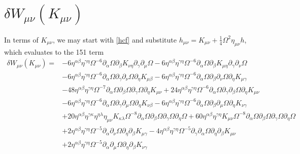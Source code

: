 \documentclass[10pt,letterpaper]{article}
\begin{document}
\section{$\delta W_{\mu\nu}(K_{\mu\nu})$}
In terms of $K_{\mu\nu}$, we may start with \eqref{hcf} and substitute $h_{\mu\nu} = K_{\mu\nu} + \frac14 \Omega^2 \eta_{\mu\nu} h$, which evaluates to the 151 term 
\begin{align}
\delta W_{\mu\nu}(K_{\mu\nu})={}&-6 \eta^{\alpha \beta} \eta^{\gamma \eta} \Omega^{-6} \partial_{\alpha}\Omega \partial_{\beta}K_{\nu \eta} \partial_{\gamma}\partial_{\mu}\Omega
 - 6 \eta^{\alpha \beta} \eta^{\gamma \eta} \Omega^{-6} \partial_{\alpha}\Omega \partial_{\beta}K_{\mu \eta} \partial_{\gamma}\partial_{\nu}\Omega\nonumber\\
& - 6 \eta^{\alpha \beta} \eta^{\gamma \eta} \Omega^{-6} \partial_{\alpha}\Omega \partial_{\gamma}\partial_{\nu}\Omega \partial_{\eta}K_{\mu \beta}
 - 6 \eta^{\alpha \beta} \eta^{\gamma \eta} \Omega^{-6} \partial_{\alpha}\Omega \partial_{\beta}\partial_{\nu}\Omega \partial_{\eta}K_{\mu \gamma}\nonumber\\
& - 48 \eta^{\alpha \beta} \eta^{\gamma \eta} \Omega^{-7} \partial_{\alpha}\Omega \partial_{\beta}\Omega \partial_{\gamma}\Omega \partial_{\eta}K_{\mu \nu}
 + 24 \eta^{\alpha \beta} \eta^{\gamma \eta} \Omega^{-6} \partial_{\alpha}\Omega \partial_{\gamma}\partial_{\beta}\Omega \partial_{\eta}K_{\mu \nu}\nonumber\\
& - 6 \eta^{\alpha \beta} \eta^{\gamma \eta} \Omega^{-6} \partial_{\alpha}\Omega \partial_{\gamma}\partial_{\mu}\Omega \partial_{\eta}K_{\nu \beta}
 - 6 \eta^{\alpha \beta} \eta^{\gamma \eta} \Omega^{-6} \partial_{\alpha}\Omega \partial_{\beta}\partial_{\mu}\Omega \partial_{\eta}K_{\nu \gamma}\nonumber\\
& + 20 \eta^{\alpha \beta} \eta^{\gamma \kappa} \eta^{\eta \lambda} \eta_{\mu \nu} K_{\kappa \lambda} \Omega^{-8} \partial_{\alpha}\Omega \partial_{\beta}\Omega \partial_{\gamma}\Omega \partial_{\eta}\Omega
 + 60 \eta^{\alpha \beta} \eta^{\gamma \eta} K_{\mu \nu} \Omega^{-8} \partial_{\alpha}\Omega \partial_{\beta}\Omega \partial_{\gamma}\Omega \partial_{\eta}\Omega\nonumber\\
& + 2 \eta^{\alpha \beta} \eta^{\gamma \eta} \Omega^{-5} \partial_{\alpha}\partial_{\nu}\Omega \partial_{\eta}\partial_{\beta}K_{\mu \gamma}
 - 4 \eta^{\alpha \beta} \eta^{\gamma \eta} \Omega^{-5} \partial_{\gamma}\partial_{\alpha}\Omega \partial_{\eta}\partial_{\beta}K_{\mu \nu}\nonumber\\
& + 2 \eta^{\alpha \beta} \eta^{\gamma \eta} \Omega^{-5} \partial_{\alpha}\partial_{\mu}\Omega \partial_{\eta}\partial_{\beta}K_{\nu \gamma}

\end{align}
\end{document}
